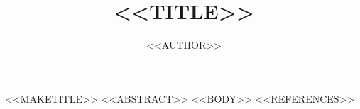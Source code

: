 \documentclass[12pt]{article}
\title{<<TITLE>>}
\author{<<AUTHOR>>}
\date{}
\begin{document}
<<MAKETITLE>>
<<ABSTRACT>>
<<BODY>>
<<REFERENCES>>
\end{document}
